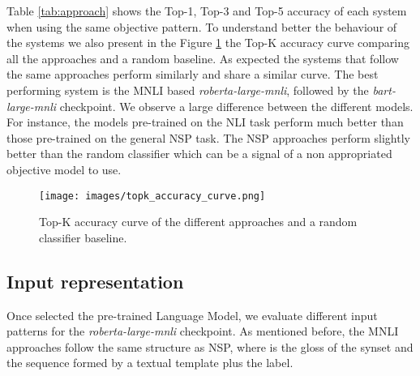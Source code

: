 \documentclass[11pt]{article}
\begin{document}
Table \ref{tab:approach} shows the Top-1, Top-3 and Top-5 accuracy of each system when using the same objective pattern. To understand better the behaviour of the systems we also present in the Figure \ref{fig:topk_curve} the Top-K accuracy curve comparing all the approaches and a random baseline. As expected the systems that follow the same approaches perform similarly and share a similar curve. The best performing system is the MNLI based \textit{roberta-large-mnli}, followed by the \textit{bart-large-mnli} checkpoint. We observe a large difference between the different models. For instance, the models pre-trained on the NLI task perform much better than those pre-trained on the general NSP task.
The NSP approaches perform slightly better than the random classifier which can be a signal of a non appropriated objective model to use. 



\begin{figure}[!t]
    \centering
    \texttt{[image: images/topk\_accuracy\_curve.png]}
    \caption{Top-K accuracy curve of the different approaches and a random classifier baseline.}
    \label{fig:topk_curve}
\end{figure}

\subsection{Input representation}

Once selected the pre-trained Language Model, we evaluate different input patterns for the \textit{roberta-large-mnli} checkpoint. As mentioned before, the MNLI approaches follow the same structure as NSP, where  is the gloss of the synset and  the sequence formed by a textual template plus the label.
\end{document}

